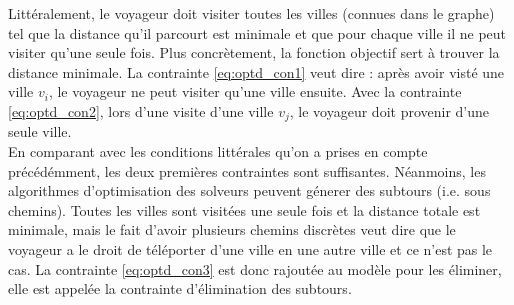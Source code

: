 \documentclass{article}
\begin{document}
Littéralement, le voyageur doit visiter toutes les villes (connues dans le graphe) tel que la distance qu'il parcourt est minimale et que pour chaque ville il ne peut visiter qu'une seule fois. Plus concrètement, la fonction objectif sert à trouver la distance minimale. La contrainte \ref{eq:optd_con1} veut dire : après avoir visté une ville \(v_i\), le voyageur ne peut visiter qu'une ville ensuite. Avec la contrainte \ref{eq:optd_con2}, lors d'une visite d'une ville \(v_j\), le voyageur doit provenir d'une seule ville. \\En comparant avec les conditions littérales qu'on a prises en compte précédémment, les deux premières contraintes sont suffisantes. Néanmoins, les algorithmes d'optimisation des solveurs peuvent génerer des subtours (i.e. sous chemins). Toutes les villes sont visitées une seule fois et la distance totale est minimale, mais le fait d'avoir plusieurs chemins discrètes veut dire que le voyageur a le droit de téléporter d'une ville en une autre ville et ce n'est pas le cas. La contrainte \ref{eq:optd_con3} est donc rajoutée au modèle pour les éliminer, elle est appelée la contrainte d'élimination des subtours.\\
\end{document}
